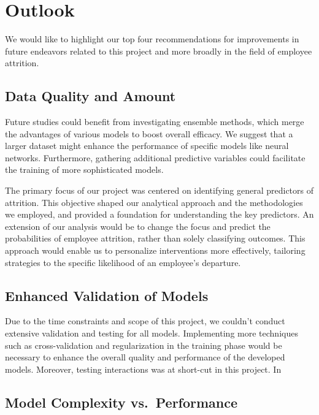 \documentclass[
]{article}
\begin{document}
\section{Outlook}\label{outlook}

We would like to highlight our top four recommendations for improvements
in future endeavors related to this project and more broadly in the
field of employee attrition.

\subsection{Data Quality and Amount}\label{data-quality-and-amount}

Future studies could benefit from investigating ensemble methods, which
merge the advantages of various models to boost overall efficacy. We
suggest that a larger dataset might enhance the performance of specific
models like neural networks. Furthermore, gathering additional
predictive variables could facilitate the training of more sophisticated
models.

The primary focus of our project was centered on identifying general
predictors of attrition. This objective shaped our analytical approach
and the methodologies we employed, and provided a foundation for
understanding the key predictors. An extension of our analysis would be
to change the focus and predict the probabilities of employee attrition,
rather than solely classifying outcomes. This approach would enable us
to personalize interventions more effectively, tailoring strategies to
the specific likelihood of an employee's departure.

\subsection{Enhanced Validation of
Models}\label{enhanced-validation-of-models}

Due to the time constraints and scope of this project, we couldn't
conduct extensive validation and testing for all models. Implementing
more techniques such as cross-validation and regularization in the
training phase would be necessary to enhance the overall quality and
performance of the developed models. Moreover, testing interactions was
at short-cut in this project. In

\subsection{Model Complexity
vs.~Performance}\label{model-complexity-vs.-performance}
\end{document}
